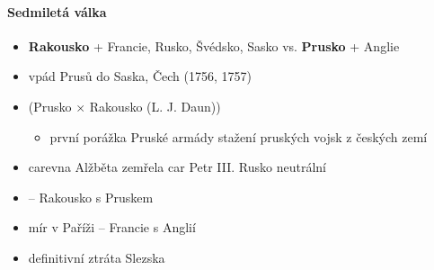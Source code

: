 \paragraph{Sedmiletá válka}
\begin{itemize}
\item \textbf{Rakousko} + Francie, Rusko, Švédsko, Sasko vs. \textbf{Prusko} + Anglie
\item vpád Prusů do Saska, Čech (1756, 1757)
\item {}  (Prusko $\times$ Rakousko (L. J. Daun))
	\begin{itemize}
	\item první porážka Pruské armády \ra stažení pruských vojsk z českých zemí
	\end{itemize}
\item carevna Alžběta zemřela \ra car Petr III. \ra Rusko neutrální
\item {} -- Rakousko s Pruskem
\item mír v Paříži -- Francie s Anglií
\item definitivní ztráta Slezska
\end{itemize}

